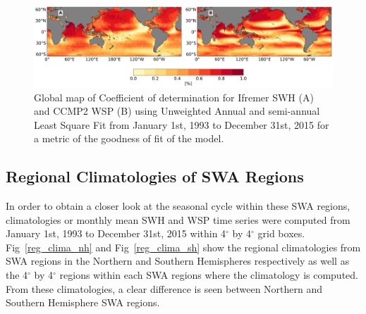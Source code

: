 \documentclass[draft,linenumbers]{agujournal2018}
\begin{document}
\begin{figure}[tbh]
\centering
\includegraphics[width=1.0\textwidth]{figs/lsf_parameters/ccmp2_ifremer_goodness_of_fit_5_par.png}
\caption{Global map of Coefficient of determination for Ifremer SWH (A) and CCMP2 WSP (B) using Unweighted Annual and semi-annual Least Square Fit from January 1st, 1993 to December 31st, 2015 for a metric of the goodness of fit of the model.}
\label{Ifremer_ccmp2_lsf_gof}
\end{figure}

\subsection{Regional Climatologies of SWA Regions}

In order to obtain a closer look at the seasonal cycle within these SWA regions, climatologies or monthly mean SWH and WSP time series were computed from January 1st, 1993 to December 31st, 2015 within 4$^{\circ}$ by 4$^{\circ}$ grid boxes. Fig~\ref{reg_clima_nh} and Fig~\ref{reg_clima_sh} show the regional climatologies from SWA regions in the Northern and Southern Hemispheres respectively as well as the 4$^{\circ}$ by 4$^{\circ}$ regions within each SWA regions where the climatology is computed. From these climatologies, a clear difference is seen between Northern and Southern Hemisphere SWA regions. 
\end{document}
